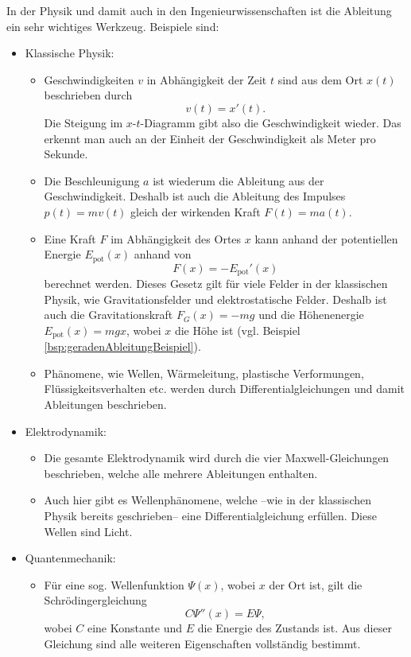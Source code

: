 \documentclass[../../main.tex]{subfiles}
\begin{document}
    \begin{example}{}
        In der Physik und damit auch in den Ingenieurwissenschaften ist die Ableitung ein sehr wichtiges Werkzeug. Beispiele sind:
        \begin{itemize}
        \item Klassische Physik:
            \begin{itemize}
                \item Geschwindigkeiten $v$ in Abhängigkeit der Zeit $t$ sind aus dem Ort $x(t)$ beschrieben durch $$v(t) = x'(t).$$ Die Steigung im $x$-$t$-Diagramm gibt also die Geschwindigkeit wieder. Das erkennt man auch an der Einheit der Geschwindigkeit als Meter pro Sekunde.
                \item Die Beschleunigung $a$ ist wiederum die Ableitung aus der Geschwindigkeit. Deshalb ist auch die Ableitung des Impulses $p(t) = mv(t)$ gleich der wirkenden Kraft $F(t) = ma(t)$.
                \item Eine Kraft $F$ im Abhängigkeit des Ortes $x$ kann anhand der potentiellen Energie $E_\text{pot}(x)$ anhand von $$F(x)=-E_\text{pot}'(x)$$ berechnet werden. Dieses Gesetz gilt für viele Felder in der klassischen Physik, wie Gravitationsfelder und elektrostatische Felder. Deshalb ist auch die Gravitationskraft $F_G(x)=-mg$ und die Höhenenergie $E_\text{pot}(x)=mgx$, wobei $x$ die Höhe ist (vgl. Beispiel \ref{bsp:geradenAbleitungBeispiel}).
                \item Phänomene, wie Wellen, Wärmeleitung, plastische Verformungen, Flüssigkeitsverhalten etc. werden durch Differentialgleichungen und damit Ableitungen beschrieben.
            \end{itemize}
        \item Elektrodynamik:
        \begin{itemize}
            \item Die gesamte Elektrodynamik wird durch die vier Maxwell-Gleichungen beschrieben, welche alle mehrere Ableitungen enthalten.
            \item Auch hier gibt es Wellenphänomene, welche --wie in der klassischen Physik bereits geschrieben-- eine Differentialgleichung erfüllen. Diese Wellen sind Licht.
        \end{itemize}
        \item Quantenmechanik:
        \begin{itemize}
            \item Für eine sog. Wellenfunktion $\Psi(x)$, wobei $x$ der Ort ist, gilt die Schrödingergleichung $$C\Psi''(x) = E\Psi,$$ wobei $C$ eine Konstante und $E$ die Energie des Zustands ist. Aus dieser Gleichung sind alle weiteren Eigenschaften vollständig bestimmt.

\end{itemize}
\end{itemize}
\end{example}
\end{document}
